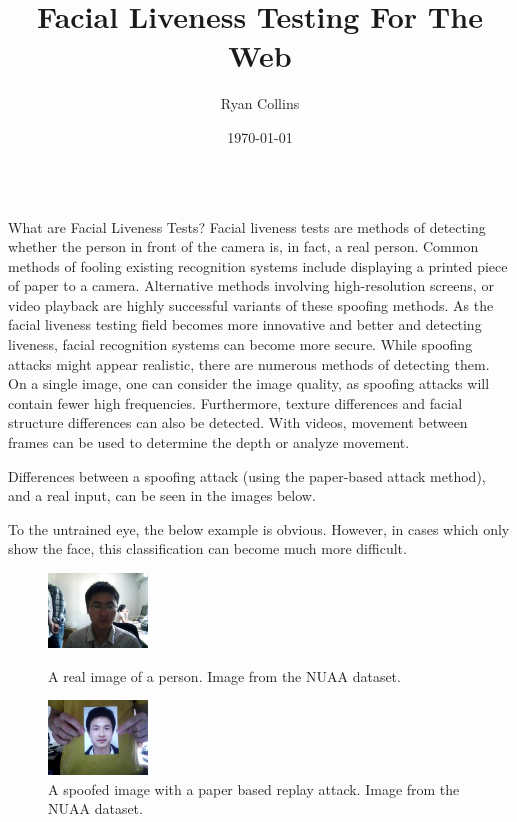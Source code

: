 \documentclass[final]{beamer}
\title[Final Year Project Poster]{Facial Liveness Testing For The Web}
\author[R Collins]{Ryan Collins}
\institute[Durham]{Department of Computer Science, Durham University}
\date{\today}
\begin{document}
  \begin{frame}{} 

  \vfill
    \begin{columns}[t]
      \begin{column}{.48\linewidth}
        \begin{block}{What are Facial Liveness Tests?}
          Facial liveness tests are methods of detecting whether the person in front of the camera is, in fact, a real person. 
          Common methods of fooling existing recognition systems include displaying a printed piece of paper to a camera. Alternative methods involving high-resolution screens, or video playback are highly successful variants of these spoofing methods.
          As the facial liveness testing field becomes more innovative and better and detecting liveness, facial recognition systems can become more secure.  
          While spoofing attacks might appear realistic, there are numerous methods of detecting them. On a single image, one can consider the image quality, as spoofing attacks will contain fewer high frequencies. Furthermore, texture differences and facial structure differences can also be detected. With videos, movement between frames can be used to determine the depth or analyze movement.
          
          Differences between a spoofing attack (using the paper-based attack method), and a real input, can be seen in the images below.

          To the untrained eye, the below example is obvious. However, in cases which only show the face, this classification can become much more difficult. 

          \begin{figure}[!tbp]
            \centering
            \begin{minipage}[b]{0.3\textwidth}
              \centering
              \includegraphics[width=100px]{RealImage.jpg}
              \caption{A real image of a person. Image from the NUAA dataset.}
            \end{minipage}
            \begin{minipage}[b]{0.3\textwidth}
              \centering
              \includegraphics[width=100px]{SpoofedImage.jpg}
            \caption{A spoofed image with a paper based replay attack. Image from the NUAA dataset.}
            \end{minipage}
          \end{figure}
        

\end{block}
\end{column}
\end{columns}
\end{frame}
\end{document}
